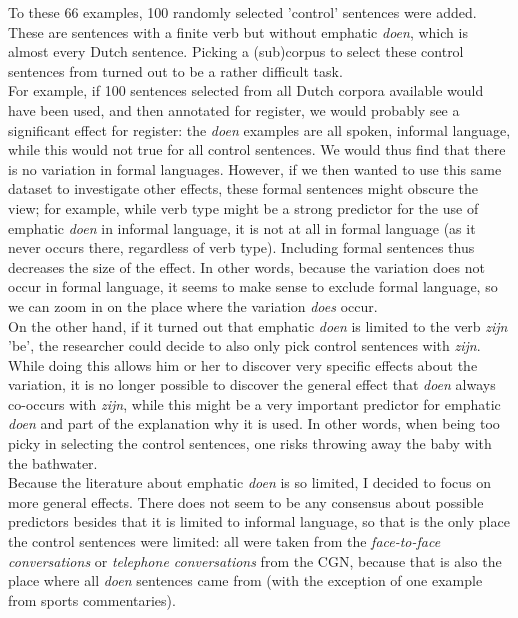 \documentclass[12pt]{article}
\begin{document}
To these 66 examples, 100 randomly selected 'control' sentences were added. These are sentences with a finite verb but without emphatic \emph{doen}, which is almost every Dutch sentence. Picking a (sub)corpus to select these control sentences from turned out to be a rather difficult task. \\\indent
For example, if 100 sentences selected from all Dutch corpora available would have been used, and then annotated for register, we would probably see a significant effect for register: the \emph{doen} examples are all spoken, informal language, while this would not true for all control sentences. We would thus find that there is no variation in formal languages. However, if we then wanted to use this same dataset to investigate other effects, these formal sentences might obscure the view; for example, while verb type might be a strong predictor for the use of emphatic \emph{doen} in informal language, it is not at all in formal language (as it never occurs there, regardless of verb type). Including formal sentences thus decreases the size of the effect. In other words, because the variation does not occur in formal language, it seems to make sense to exclude formal language, so we can zoom in on the place where the variation \emph{does} occur. \\\indent 
On the other hand, if it turned out that emphatic \emph{doen} is limited to the verb \emph{zijn} 'be', the researcher could decide to also only pick control sentences with \emph{zijn}. While doing this allows him or her to discover very specific effects about the variation, it is no longer possible to discover the general effect that \emph{doen} always co-occurs with \emph{zijn}, while this might be a very important predictor for emphatic \emph{doen} and part of the explanation why it is used. In other words, when being too picky in selecting the control sentences, one risks throwing away the baby with the bathwater.\\\indent
Because the literature about emphatic \emph{doen} is so limited, I decided to focus on more general effects. There does not seem to be any consensus about possible predictors besides that it is limited to informal language, so that is the only place the control sentences were limited: all were taken from the \emph{face-to-face conversations} or \emph{telephone conversations} from the CGN, because that is also the place where all \emph{doen} sentences came from (with the exception of one example from sports commentaries).

\end{document}
